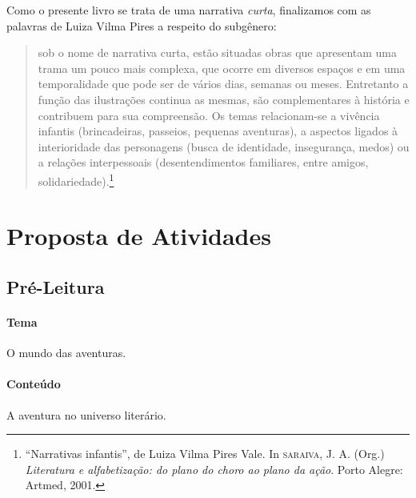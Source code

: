 \documentclass[11pt]{extarticle}
\begin{document}
Como o presente livro se trata de uma narrativa \textit{curta}, finalizamos com as palavras de Luiza Vilma Pires a respeito do
subgênero:

\begin{quote}
sob o nome de narrativa curta, estão situadas obras que apresentam uma trama um pouco mais complexa, que ocorre em diversos espaços e em uma temporalidade que pode ser de vários dias, semanas ou meses. Entretanto a função das ilustrações continua as mesmas, são complementares à história e contribuem para sua compreensão. Os temas relacionam-se a vivência infantis (brincadeiras, passeios, pequenas aventuras), a aspectos ligados à interioridade das personagens (busca de identidade, insegurança,  
medos) ou a relações interpessoais (desentendimentos familiares, entre amigos, solidariedade).\footnote{“Narrativas infantis”, de Luiza Vilma Pires Vale. In \textsc{saraiva}, J. A. (Org.) \textit{Literatura e alfabetização: do plano do choro ao plano da ação}. Porto Alegre: Artmed, 2001.} 
\end{quote}


\section{Proposta de Atividades}
\subsection{Pré-Leitura}


\paragraph{Tema} O mundo das aventuras.  

\paragraph{Conteúdo} A aventura no universo literário. 
\end{document}
